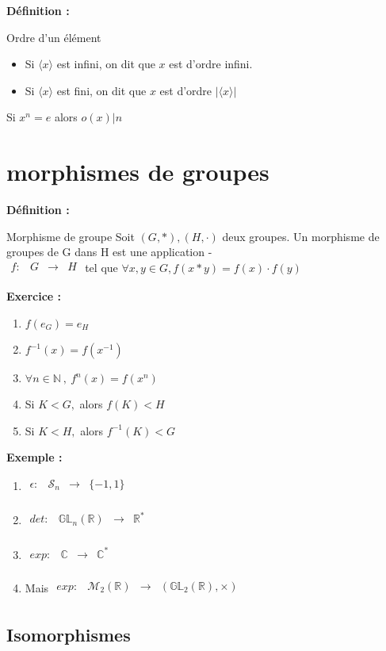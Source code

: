 \documentclass{report}
\newenvironment{definition}[1][]{
    \begin{tcolorbox}[colframe= white]
    \textbf{Définition :} 
    #1 \par
    }
    {\end{tcolorbox}}
\newenvironment{exemple}{\begin{tcolorbox}[colframe= white]
    \textbf{Exemple :}
     \par}
    {\end{tcolorbox}}
\newenvironment{exo}{\begin{tcolorbox}[colframe= white]
    \textbf{Exercice :}
    \par}
    {\end{tcolorbox}}
\newcommand{\mat}[2]{
    \mathcal{M}_{#1}(\mathbb{#2})
}
\newcommand{\gl}[2]{
    \mathcal{\mathbb{G}\mathbb{L}}_{#1}(\mathbb{#2})
}
\newcommand{\fctsarg}[3]{
    \begin{array}{lrcl}
    #1: & #2 & \longrightarrow & #3 \\
    \end{array}
}
\newcommand{\N}{\mathbb{N}}
\newcommand{\R}{\mathbb{R}}
\newcommand{\C}{\mathbb{C}}
\newcommand{\sn}{\mathcal{S}_{n}}
\begin{document}
\begin{definition}{Ordre d'un élément}
\begin{itemize}[label=$\bullet$]
\item Si $\langle x \rangle$ est infini, on dit que $x$ est d'ordre infini.
\item Si $\langle x \rangle$ est fini, on dit que $x$ est d'ordre $\lvert\langle x \rangle\rvert$
\end{itemize}
Si $x^{n}=e$ alors $o(x)|n$
\end{definition}

\section{morphismes de groupes}
\begin{definition}{Morphisme de groupe}
Soit $(G,\ast), (H,\cdot)$ deux groupes. Un morphisme de groupes de G dans H est une application
{\color{white}-}\\
$\fctsarg{f}{G}{H}$ tel que $\forall x,y \in G, f(x \ast y) = f(x) \cdot f(y)$
\end{definition}

\begin{exo}
\begin{enumerate}
\item $f(e_{G})=e_{H}$
\item $f^{-1}(x)=f(x^{-1})$
\item $\forall n \in \N~,~ f^{n}(x)=f(x^{n})$
\item Si $K < G,$ alors $f(K) < H$
\item Si $K < H,$ alors $f^{-1}(K) < G$
\end{enumerate}
\end{exo}

\begin{exemple}
\begin{enumerate}
    \item $\fctsarg{\epsilon}{\sn}{\{-1,1\}}$ 
    \item $\fctsarg{det}{\gl{n}{\R}}{\R^*}$
    \item $\fctsarg{exp}{\C}{\C^*}$
    \item Mais $\fctsarg{exp}{\mat{2}{R}}{(\gl{2}{\R},\times)}$
\end{enumerate}
\end{exemple}

\subsection{Isomorphismes}
\end{document}
